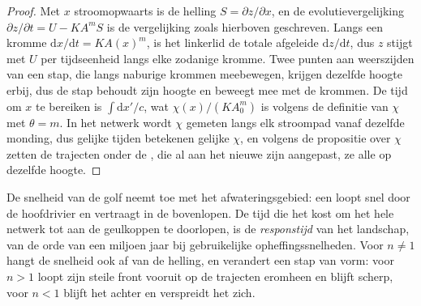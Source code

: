 \begin{proof}
Met $x$ stroomopwaarts is de helling $S = \partial z/\partial x$, en de
evolutievergelijking $\partial z/\partial t = U - K A^m S$ is de vergelijking
zoals hierboven geschreven. Langs een kromme $\mathrm{d}x/\mathrm{d}t = K A(x)^m$,
is het linkerlid de totale afgeleide $\mathrm{d}z/\mathrm{d}t$, dus $z$ stijgt met $U$ per
tijdseenheid langs elke zodanige kromme. Twee punten aan weerszijden van een stap,
die langs naburige krommen meebewegen, krijgen dezelfde hoogte erbij, dus de stap
behoudt zijn hoogte en beweegt mee met de krommen. De tijd om $x$ te bereiken is
$\int \mathrm{d}x'/c$, wat $\chi(x)/(K A_0^m)$ is volgens de definitie van
$\chi$ met $\theta = m$. In het netwerk wordt $\chi$ gemeten langs elk
stroompad vanaf dezelfde monding, dus gelijke tijden betekenen gelijke $\chi$, en
volgens de propositie over $\chi$ zetten de trajecten onder de , die
al aan het nieuwe  zijn aangepast, ze alle op dezelfde hoogte.
\end{proof}

De snelheid van de golf neemt toe met het afwateringsgebied: een  loopt
snel door de hoofdrivier en vertraagt in de bovenlopen. De tijd die het kost om het hele
netwerk tot aan de geulkoppen te doorlopen, is de \emph{responstijd} van het landschap,
van de orde van een miljoen jaar bij gebruikelijke opheffingssnelheden. Voor $n \ne 1$
hangt de snelheid ook af van de helling, en verandert een stap van vorm: voor $n >
1$ loopt zijn steile front vooruit op de trajecten eromheen en blijft scherp, voor $n <
1$ blijft het achter en verspreidt het zich.

